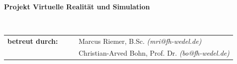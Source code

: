 \documentclass[a4paper, 12pt, hidelinks]{report}
\begin{document}
\begin{verbatim}


\end{verbatim}

\begin{center}
\textbf{Projekt Virtuelle Realität und Simulation}
\end{center}

\begin{verbatim}


\end{verbatim}

\begin{flushleft}
\begin{tabular}{llll}

\textbf{betreut durch:}
& & & Marcus Riemer, B.Sc. \emph{(mri@fh-wedel.de)}\\
& & & Christian-Arved Bohn, Prof. Dr. \emph{(bo@fh-wedel.de)}\\

\end{tabular}
\end{flushleft}


\newpage


\newpage


\tableofcontents
\listoffigures
\newpage









\end{document}
